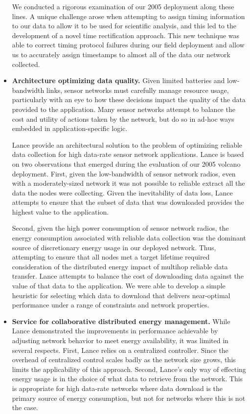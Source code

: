 \begin{itemize}
We conducted a rigorous examination of our 2005 deployment along these lines.
A unique challenge arose when attempting to assign timing information to our
data to allow it to be used for scientific analysis, and this led to the
development of a novel time rectification approach. This new technique was
able to correct timing protocol failures during our field deployment and
allow us to accurately assign timestamps to almost all of the data our
network collected.

\item \textbf{Architecture optimizing data quality.} Given limited batteries
and low-bandwidth links, sensor networks must carefully manage resource
usage, particularly with an eye to how these decisions impact the quality of
the data provided to the application. Many sensor networks attempt to balance
the cost and utility of actions taken by the network, but do so in ad-hoc
ways embedded in application-specific logic.

Lance provide an architectural solution to the problem of optimizing reliable
data collection for high data-rate sensor network applications. Lance is
based on two observations that emerged during the evaluation of our 2005
volcano deployment. First, given the low-bandwidth of sensor network radios,
even with a moderately-sized network it was not possible to reliable extract
all the data the nodes were collecting. Given the inevitability of data loss,
Lance attempts to ensure that the subset of data that was downloaded provides
the highest value to the application.

Second, given the high power consumption of sensor network radios, the energy
consumption associated with reliable data collection was the dominant source
of discretionary energy usage in our deployed network. Thus, attempting to
ensure that all nodes met a target lifetime required consideration of the
distributed energy impact of multihop reliable data transfer. Lance attempts
to balance the cost of downloading data against the value of that data to the
application. We were able to develop a simple heuristic for selecting which
data to download that delivers near-optimal performance under a range of
constraints and network properties.

\item \textbf{Service for collaborative distributed energy management.} While
Lance demonstrated the improvements in performance achievable by adjusting
network behavior to meet energy availability, it was limited in several
respects. First, Lance relies on a centralized controller. Since the overhead
of centralized control scales badly as the network size grows, this limits
the applicability of this approach. Second, Lance's only way of effecting
energy usage is in the choice of what data to retrieve from the network. This
is appropriate for high data-rate networks where data download is the primary
source of energy consumption, but not for networks where this is not the
case.


\end{itemize}
